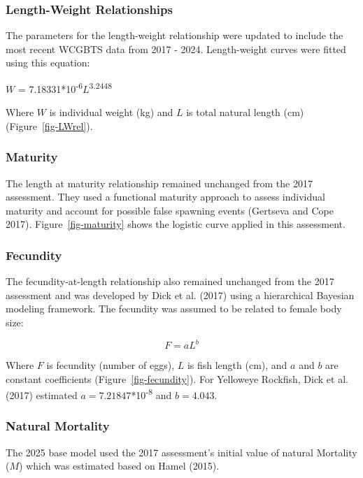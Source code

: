 \documentclass[
]{scrartcl}
\begin{document}
\subsubsection{Length-Weight
Relationships}\label{length-weight-relationships}

The parameters for the length-weight relationship were updated to
include the most recent WCGBTS data from 2017 - 2024. Length-weight
curves were fitted using this equation:

\(W\) = 7.18331*10\textsuperscript{-6}\(L\)\textsuperscript{3.2448}

Where \(W\) is individual weight (kg) and \(L\) is total natural length
(cm) (Figure~\ref{fig-LWrel}).

\subsubsection{Maturity}\label{maturity}

The length at maturity relationship remained unchanged from the 2017
assessment. They used a functional maturity approach to assess
individual maturity and account for possible false spawning events
(Gertseva and Cope 2017). Figure~\ref{fig-maturity} shows the logistic
curve applied in this assessment.

\subsubsection{Fecundity}\label{fecundity}

The fecundity-at-length relationship also remained unchanged from the
2017 assessment and was developed by Dick et al. (2017) using a
hierarchical Bayesian modeling framework. The fecundity was assumed to
be related to female body size:

\[
F = aL^b
\]

Where \(F\) is fecundity (number of eggs), \(L\) is fish length (cm),
and \(a\) and \(b\) are constant coefficients
(Figure~\ref{fig-fecundity}). For Yelloweye Rockfish, Dick et al. (2017)
estimated \(a = 7.21847\)*10\textsuperscript{-8} and \(b = 4.043\).

\subsubsection{Natural Mortality}\label{natural-mortality}

The 2025 base model used the 2017 assessment's initial value of natural
Mortality (\(M\)) which was estimated based on Hamel (2015).
\end{document}
